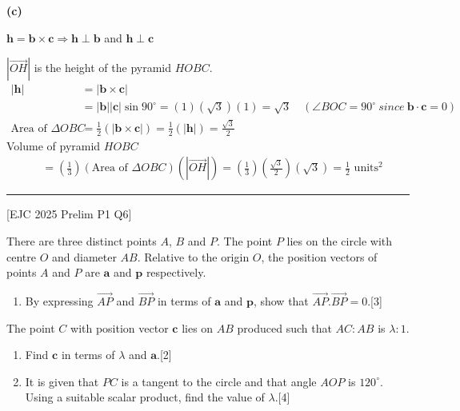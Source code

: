 \documentclass[a4paper,11pt,oneside]{book}
\newcounter{wq}[section]
\newcommand{\Q}[1]{\par\needspace{5\baselineskip}\medskip\stepcounter{wq}\noindent\textbf{\thewq}\quad #1\par}
\begin{document}
\par\smallskip\noindent\textbf{(c)}\par\nopagebreak{}\begin{center}\end{center}$\mathbf h=\mathbf b\times\mathbf c\Rightarrow\mathbf h\perp\mathbf b$ and $\mathbf h\perp\mathbf c$\par $\left|\overrightarrow{OH}\right|$ is the height of the pyramid $HOBC$.\begin{align*}|\mathbf h|&=|\mathbf b\times\mathbf c|\\ &=|\mathbf b||\mathbf c|\sin90^\circ=(1)(\sqrt3)(1)=\sqrt3\quad(\angle BOC=90^\circ\ since\ \mathbf b\cdot\mathbf c=0)\\ \text{Area of }\Delta OBC&=\tfrac12(|\mathbf b\times\mathbf c|)=\tfrac12(|\mathbf h|)=\frac{\sqrt3}{2}\end{align*}Volume of pyramid $HOBC$\begin{align*}&=\left(\tfrac13\right)(\text{Area of }\Delta OBC)\left(\left|\overrightarrow{OH}\right|\right)=\left(\tfrac13\right)\left(\tfrac{\sqrt3}{2}\right)\left(\sqrt3\right)=\tfrac12\text{ units}^2\end{align*}
\par\medskip\hrule\medskip
\Q{\textcolor{black!60}{\small[EJC 2025 Prelim P1 Q6]}\par\smallskip There are three distinct points $A$, $B$ and $P$. The point $P$ lies on the circle with centre $O$ and diameter $AB$. Relative to the origin $O$, the position vectors of points $A$ and $P$ are $\mathbf a$ and $\mathbf p$ respectively.\begin{enumerate}[label=\textbf{(\alph*)},leftmargin=2.2em,itemsep=3pt]\item By expressing $\overrightarrow{AP}$ and $\overrightarrow{BP}$ in terms of $\mathbf a$ and $\mathbf p$, show that $\overrightarrow{AP}.\overrightarrow{BP}=0$.\hfill[3]\end{enumerate}The point $C$ with position vector $\mathbf c$ lies on $AB$ produced such that $AC:AB$ is $\lambda:1$.\begin{enumerate}[label=\textbf{(\alph*)},leftmargin=2.2em,itemsep=3pt,start=2]\item Find $\mathbf c$ in terms of $\lambda$ and $\mathbf a$.\hfill[2]\item It is given that $PC$ is a tangent to the circle and that angle $AOP$ is $120^\circ$. Using a suitable scalar product, find the value of $\lambda$.\hfill[4]\end{enumerate}}
\end{document}
